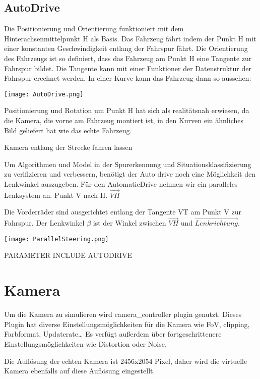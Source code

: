 \subsection{AutoDrive}
Die Positionierung und Orientierung funktioniert mit dem Hinterachsenmittelpunkt H als Basis.
Das Fahrzeug fährt indem der Punkt H mit einer konstanten Geschwindigkeit entlang der Fahrspur fährt.
Die Orientierung des Fahrzeugs ist so definiert, dass das Fahrzeug am Punkt H eine Tangente zur Fahrspur bildet.
Die Tangente kann mit einer Funktioner der Datenstruktur der Fahrspur erechnet werden. 
In einer Kurve kann das Fahrzeug dann so aussehen:

\begin{center}
    \texttt{[image: AutoDrive.png]}
\end{center}

Positionierung und Rotation um Punkt H hat sich als realitätsnah erwiesen, da die Kamera, die vorne am Fahrzeug montiert ist, in den Kurven ein ähnliches Bild geliefert hat wie das echte Fahrzeug.


Kamera entlang der Strecke fahren lassen

Um Algorithmen und Model in der Spurerkennung und Situationsklassifizierung zu verifizieren und verbessern, 
benötigt der Auto drive noch eine Möglichkeit den Lenkwinkel auszugeben.
Für den AutomaticDrive nehmen wir ein paralleles Lenksystem an.
Punkt V nach H. $\vec{VH}$ 

Die Vorderräder sind ausgerichtet entlang der Tangente VT am Punkt V zur Fahrspur.
Der Lenkwinkel $\beta$ ist der Winkel zwischen $\vec{VH}$ und $\vec{Lenkrichtung}$. 

\begin{center}
    \texttt{[image: ParallelSteering.png]}
\end{center}

PARAMETER INCLUDE AUTODRIVE


\section{Kamera}
Um die Kamera zu simulieren wird camera\_controller plugin genutzt.
Dieses Plugin hat diverse Einstellungsmöglichkeiten für die Kamera wie FoV, clipping, Farbformat, Updaterate\dots
Es verfügt außerdem über fortgeschrittenere Einstellungsmöglichkeiten wie Distortion oder Noise.

Die Auflösung der echten Kamera ist 2456x2054 Pixel, daher wird die virtuelle Kamera ebenfalls auf diese Auflösung eingestellt.

